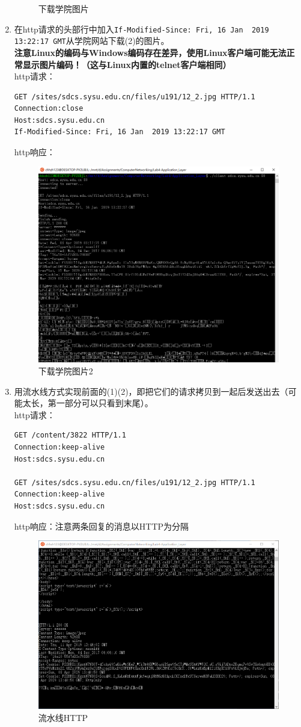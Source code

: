 \documentclass[logo,reportComp]{thesis}
\begin{document}
\begin{enumerate}
\begin{figure}[H]
\caption{下载学院图片}
\label{fig:http-2}
\end{figure}
    \item 在http请求的头部行中加入\verb'If-Modified-Since: Fri, 16 Jan  2019 13:22:17 GMT'从学院网站下载(2)的图片。\\
    \textbf{注意Linux的编码与Windows编码存在差异，使用Linux客户端可能无法正常显示图片编码！（这与Linux内置的telnet客户端相同）}\\
http请求：
\begin{lstlisting}
GET /sites/sdcs.sysu.edu.cn/files/u191/12_2.jpg HTTP/1.1
Connection:close
Host:sdcs.sysu.edu.cn
If-Modified-Since: Fri, 16 Jan  2019 13:22:17 GMT
\end{lstlisting}
http响应：
\begin{figure}[H]
\centering
\includegraphics[width=0.8\linewidth]{fig/http-3.PNG}
\caption{下载学院图片2}
\label{fig:http-3}
\end{figure}
    \item 用流水线方式实现前面的(1)(2)，即把它们的请求拷贝到一起后发送出去（可能太长，第一部分可以只看到末尾）。\\
http请求：
\begin{lstlisting}
GET /content/3822 HTTP/1.1
Connection:keep-alive
Host:sdcs.sysu.edu.cn

GET /sites/sdcs.sysu.edu.cn/files/u191/12_2.jpg HTTP/1.1
Connection:keep-alive
Host:sdcs.sysu.edu.cn
\end{lstlisting}
http响应：注意两条回复的消息以HTTP为分隔
\begin{figure}[H]
\centering
\includegraphics[width=0.8\linewidth]{fig/http-4.PNG}
\caption{流水线HTTP}
\label{fig:http-4}
\end{figure}


\end{enumerate}
\end{document}
